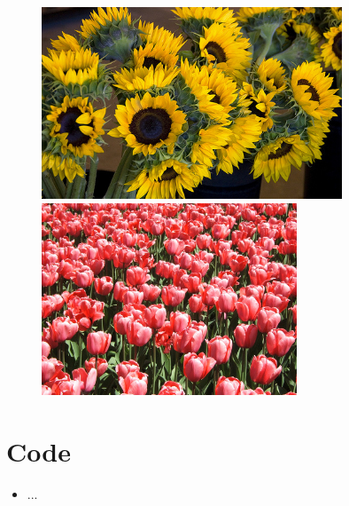 \documentclass[t]{beamer}
\begin{document}
\begin{frame}
\begin{figure}
\begin{minipage}{0.4\textwidth}
        \end{minipage}
    \end{figure}
    \begin{figure}
        \centering
        \begin{minipage}{0.4\textwidth}
            \centering
            \includegraphics[width=0.8\textwidth]{./teach-plots/sunflower.jpg} %
        \end{minipage}\hfill
        \begin{minipage}{0.4\textwidth}
            \centering
            \includegraphics[width=0.68\textwidth]{./teach-plots/tulip.jpg} %
        \end{minipage}
    \end{figure}
\end{frame}

\section{Code}
\begin{frame}
    \begin{itemize}
        \item ...
    \end{itemize}
\end{frame}
\end{document}
